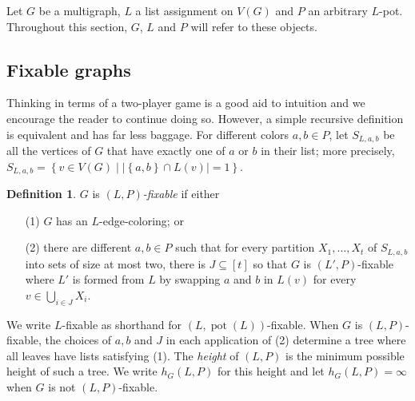 \documentclass[12pt]{article}
\theoremstyle{plain}
\theoremstyle{definition}
\newtheorem{defn}{Definition}
\theoremstyle{remark}
\newcommand{\set}[1]{\left\{ #1 \right\}}
\newcommand{\setb}[3]{\left\{ #1 \in #2 \mid #3 \right\}}
\newcommand{\card}[1]{\left|#1\right|}
\newcommand{\irange}[1]{\left[#1\right]}
\newcommand{\pot}{\operatorname{pot}}
\begin{document}
Let $G$ be a multigraph, $L$ a list assignment on $V(G)$ and $P$ an arbitrary $L$-pot.  Throughout this section, $G$, $L$ and $P$ will refer to these objects.

\subsection{Fixable graphs}
Thinking in terms of a two-player game is a good aid to intuition and we encourage the reader to continue doing so. However, a simple recursive definition is equivalent and has far less baggage. For different colors $a,b \in P$, let $S_{L,a,b}$ be all the vertices of $G$ that have exactly one of $a$ or $b$ in their list; more precisely, $S_{L,a,b} = \setb{v}{V(G)}{\card{\set{a,b} \cap L(v)} = 1}$.  

\begin{defn}
$G$ is \emph{$(L, P)$-fixable} if either
\begin{enumerate}
\item[(1)] $G$ has an $L$-edge-coloring; or
\item[(2)] there are different $a,b \in P$ such that for every partition $X_1, \ldots, X_t$ of $S_{L,a,b}$ into sets of size at most two, 
      there is $J \subseteq \irange{t}$ so that $G$ is $(L', P)$-fixable where $L'$ is formed from $L$ by swapping $a$ and $b$ in $L(v)$ for every $v \in \bigcup_{i \in J} X_i$.
\end{enumerate}
\end{defn}

We write $L$-fixable as shorthand for $(L, \pot(L))$-fixable. When $G$ is $(L, P)$-fixable, the choices of $a,b$ and $J$ in each application of (2) determine a tree where all leaves have lists satisfying (1).  The \emph{height} of $(L, P)$ is the minimum possible height of such a tree.  We write $h_G(L, P)$ for this height and let $h_G(L, P) = \infty$ when $G$ is not $(L,P)$-fixable. 
\end{document}
